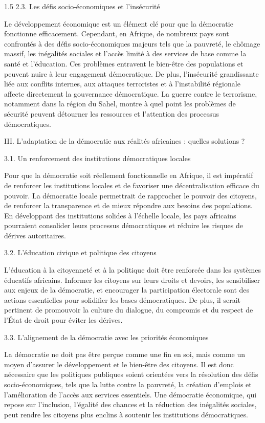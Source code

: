 \documentclass[12pt]{article}
\begin{document}
\begin{spacing}{1.5}
2.3. Les défis socio-économiques et l'insécurité
 
Le développement économique est un élément clé pour que la démocratie fonctionne efficacement. Cependant, en Afrique, de nombreux pays sont confrontés à des défis socio-économiques majeurs tels que la pauvreté, le chômage massif, les inégalités sociales et l'accès limité à des services de base comme la santé et l'éducation. Ces problèmes entravent le bien-être des populations et peuvent nuire à leur engagement démocratique. De plus, l'insécurité grandissante liée aux conflits internes, aux attaques terroristes et à l'instabilité régionale affecte directement la gouvernance démocratique. La guerre contre le terrorisme, notamment dans la région du Sahel, montre à quel point les problèmes de sécurité peuvent détourner les ressources et l'attention des processus démocratiques.

 III. L'adaptation de la démocratie aux réalités africaines : quelles solutions ?

3.1. Un renforcement des institutions démocratiques locales

Pour que la démocratie soit réellement fonctionnelle en Afrique, il est impératif de renforcer les institutions locales et de favoriser une décentralisation efficace du pouvoir. La démocratie locale permettrait de rapprocher le pouvoir des citoyens, de renforcer la transparence et de mieux répondre aux besoins des populations. En développant des institutions solides à l'échelle locale, les pays africains pourraient consolider leurs processus démocratiques et réduire les risques de dérives autoritaires.

3.2. L'éducation civique et politique des citoyens  

L'éducation à la citoyenneté et à la politique doit être renforcée dans les systèmes éducatifs africains. Informer les citoyens sur leurs droits et devoirs, les sensibiliser aux enjeux de la démocratie, et encourager la participation électorale sont des actions essentielles pour solidifier les bases démocratiques. De plus, il serait pertinent de promouvoir la culture du dialogue, du compromis et du respect de l'État de droit pour éviter les dérives.

3.3. L'alignement de la démocratie avec les priorités économiques 

La démocratie ne doit pas être perçue comme une fin en soi, mais comme un moyen d'assurer le développement et le bien-être des citoyens. Il est donc nécessaire que les politiques publiques soient orientées vers la résolution des défis socio-économiques, tels que la lutte contre la pauvreté, la création d'emplois et l'amélioration de l'accès aux services essentiels. Une démocratie économique, qui repose sur l'inclusion, l'égalité des chances et la réduction des inégalités sociales, peut rendre les citoyens plus enclins à soutenir les institutions démocratiques.


\end{spacing}
\end{document}
